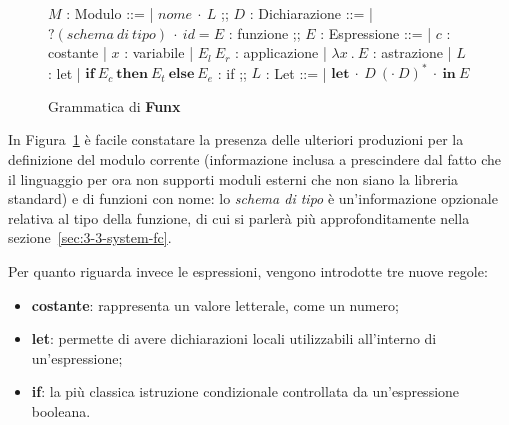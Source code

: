 \newpage

\begin{figure}
    \begin{bnf}
        $M$ : \small{Modulo} ::=
        | $nome\ \cdot\ L$
        ;;
        $D$ : \small{Dichiarazione} ::=
        | $?(schema\ di\ tipo)\ \cdot\ id = E$ : \small{funzione}
        ;;
        $E$ : \small{Espressione} ::=
        | $c$ : \small{costante}
        | $x$ : \small{variabile}
        | $E_l\ E_r$ : \small{applicazione}
        | $\lambda x\ .\ E$ : \small{astrazione}
        | $L$ : \small{let}
        | $\textbf{if}\ E_c\ \textbf{then}\ E_t\ \textbf{else}\ E_e$ : \small{if}
        ;;
        $L$ : \small{Let} ::=
        | $\textbf{let}\ \cdot\ D\ (\cdot\ D)^*\ \cdot\ \textbf{in}\ E$
    \end{bnf}
    \caption{Grammatica di \textbf{Funx}}
    \label{fig:2-3-funx-syntax}
    \vspace{4mm}
\end{figure}

\noindent In Figura~\ref{fig:2-3-funx-syntax} è facile constatare la presenza delle ulteriori produzioni per la definizione
del modulo corrente (informazione inclusa a prescindere dal fatto che il linguaggio per ora non supporti moduli esterni
che non siano la libreria standard) e di funzioni con nome: lo \textit{schema di tipo} è un'informazione opzionale
relativa al tipo della funzione, di cui si parlerà più approfonditamente nella sezione~\ref{sec:3-3-system-fc}.

\noindent Per quanto riguarda invece le espressioni, vengono introdotte tre nuove regole:
\begin{itemize}
    \item \textbf{costante}: rappresenta un valore letterale, come un numero;
    \item \textbf{let}: permette di avere dichiarazioni locali utilizzabili all'interno di un'espressione;
    \item \textbf{if}: la più classica istruzione condizionale controllata da un'espressione booleana.
\end{itemize}

